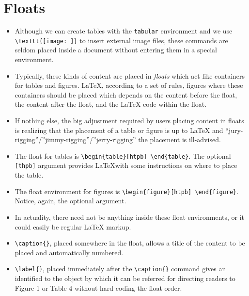 \section{Floats}
\begin{itemize}
\item Although we can create tables with the \texttt{tabular}
  environment and we use \verb!\texttt{[image: ]}! to insert external
  image files, these commands are seldom placed inside a document
  without entering them in a special environment.
\item Typically, these kinds of content are placed in \textit{floats}
  which act like containers for tables and figures. \LaTeX{},
  according to a set of rules, figures where these containers should
  be placed which depends on the content before the float, the content
  after the float, and the \LaTeX{} code within the float.

\item If nothing else, the big adjustment required by users placing
  content in floats is realizing that the placement of a table or
  figure is up to \LaTeX{} and
  ``jury-rigging''/''jimmy-rigging''/''jerry-rigging'' the placement
  is ill-advised.

\item The float for tables is
  \verb!\begin{table}[htpb] \end{table}!. The optional \verb![thpb]!
  argument provides \LaTeX with some instructions on where to place
  the table.

\item The float environment for figures is
  \verb!\begin{figure}[htpb] \end{figure}!. Notice, again, the
  optional argument.

\item In actuality, there need not be anything inside these float
  environments, or it could easily be regular \LaTeX{} markup.

\item \verb!\caption{}!, placed somewhere in the float, allows a title
  of the content to be placed and automatically numbered.

\item \verb!\label{}!, placed immediately after the \verb!\caption{}!
  command gives an identified to the object by which it can be
  referred for directing readers to Figure 1 or Table 4 without
  hard-coding the float order.


\end{itemize}
